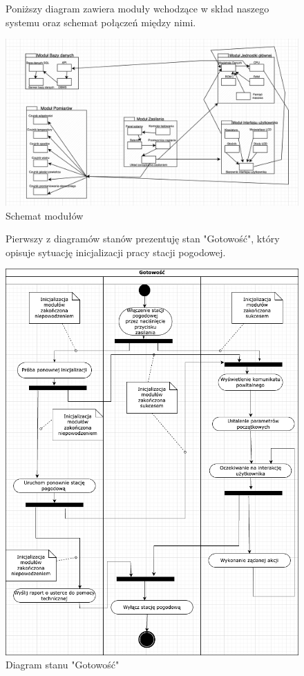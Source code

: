 \documentclass{article}
\begin{document}
\begin{figure}
    \centering
    \begin{minipage}{0.6\textwidth}
        \centering
        \large Poniższy diagram zawiera moduły wchodzące w skład naszego systemu oraz schemat połączeń między nimi.
    \end{minipage}
    \includegraphics[scale=0.5]{moduły.png}
    \caption{Schemat modułów}
    \label{etykieta}
\end{figure}

\begin{figure}
    \centering
    \begin{minipage}{0.6\textwidth}
        \centering
        \large Pierwszy z diagramów stanów prezentuję stan "Gotowość", który opisuje sytuację inicjalizacji pracy stacji pogodowej.
    \end{minipage}
    \includegraphics[scale=0.5]{gotowosc.png}
    \caption{Diagram stanu "Gotowość"}
    \label{etykieta1}
\end{figure}
\end{document}
